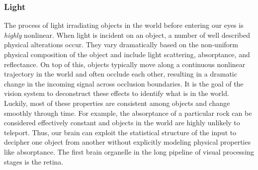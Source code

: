 \subsubsection{Light}
The process of light irradiating objects in the world before entering our eyes is \textit{highly} nonlinear. When light is incident on an object, a number of well described physical alterations occur. They vary dramatically based on the non-uniform physical composition of the object and include light scattering, absorptance, and reflectance. On top of this, objects typically move along a continuous nonlinear trajectory in the world and often occlude each other, resulting in a dramatic change in the incoming signal across occlusion boundaries. It is the goal of the vision system to deconstruct these effects to identify what is in the world. Luckily, most of these properties are consistent among objects and change smoothly through time. For example, the absorptance of a particular rock can be considered effectively constant and objects in the world are highly unlikely to teleport. Thus, our brain can exploit the statistical structure of the input to decipher one object from another without explicitly modeling physical properties like absorptance. The first brain organelle in the long pipeline of visual processing stages is the retina.


